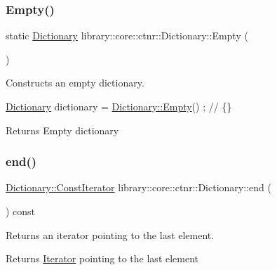 \subsubsection{\texorpdfstring{Empty()}{Empty()}}
{\footnotesize\ttfamily static \hyperlink{classlibrary_1_1core_1_1ctnr_1_1_dictionary}{Dictionary} library\+::core\+::ctnr\+::\+Dictionary\+::\+Empty (\begin{DoxyParamCaption}{ }\end{DoxyParamCaption})\hspace{0.3cm}{\ttfamily [static]}}



Constructs an empty dictionary. 


\begin{DoxyCode}
\hyperlink{classlibrary_1_1core_1_1ctnr_1_1_dictionary_a823a08112d9ee271f9fa5833f030ea1a}{Dictionary} dictionary = \hyperlink{classlibrary_1_1core_1_1ctnr_1_1_dictionary_a236f8efd7a01e7a91061e8ed933112b7}{Dictionary::Empty}() ; \textcolor{comment}{// \{\}}
\end{DoxyCode}


\begin{DoxyReturn}{Returns}
Empty dictionary 
\end{DoxyReturn}
\mbox{\label{classlibrary_1_1core_1_1ctnr_1_1_dictionary_ace2fb3bdb88a059090e8b0265d97e57e}} 
\subsubsection{\texorpdfstring{end()}{end()}\hspace{0.1cm}{\footnotesize\ttfamily [1/2]}}
{\footnotesize\ttfamily \hyperlink{classlibrary_1_1core_1_1ctnr_1_1_dictionary_1_1_const_iterator}{Dictionary\+::\+Const\+Iterator} library\+::core\+::ctnr\+::\+Dictionary\+::end (\begin{DoxyParamCaption}{ }\end{DoxyParamCaption}) const}



Returns an iterator pointing to the last element. 

\begin{DoxyReturn}{Returns}
\hyperlink{classlibrary_1_1core_1_1ctnr_1_1_dictionary_1_1_iterator}{Iterator} pointing to the last element 
\end{DoxyReturn}
\mbox{\label{classlibrary_1_1core_1_1ctnr_1_1_dictionary_a16ed18981bcf7ffdc7308801cc4b9d56}} 
